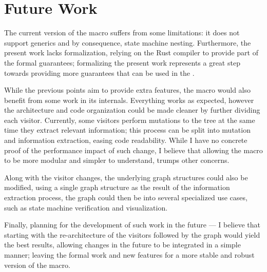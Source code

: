 \section{Future Work}

The current version of the macro suffers from some limitations:
it does not support generics and by consequence, state machine nesting.
Furthermore, the present work lacks formalization, relying on the Rust compiler to provide part of the formal guarantees;
formalizing the present work represents a great step towards providing more guarantees that can be used in the .

While the previous points aim to provide extra features, the macro would also benefit from some work in its internals.
Everything works as expected, however the architecture and code organization could be made cleaner by further dividing each visitor.
Currently, some visitors perform mutations to the tree at the same time they extract relevant information;
this process can be split into mutation and information extraction, easing code readability.
While I have no concrete proof of the performance impact of such change,
I believe that allowing the macro to be more modular and simpler to understand, trumps other concerns.

Along with the visitor changes, the underlying graph structures could also be modified,
using a single graph structure as the result of the information extraction process,
the graph could then be  into several specialized use cases, such as state machine verification and visualization.

Finally, planning for the development of such work in the future ---
I believe that starting with the re-architecture of the visitors followed by the graph would yield the best results,
allowing changes in the future to be integrated in a simple manner;
leaving the formal work and new features for a more stable and robust version of the macro.
